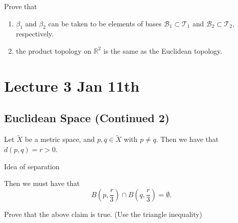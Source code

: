 \documentclass[notoc,notitlepage]{tufte-book}
\begin{document}
\begin{ex}
  Prove that
  \begin{enumerate}
    \item $\beta_1$ and $\beta_2$ can be taken to be elements of
      bases $\mathcal{B}_1 \subset \mathcal{T}_1$ and
      $\mathcal{B}_2 \subset \mathcal{T}_2$, respectively.
    \item the product topology on $\mathbb{R}^2$ is the same
      as the Euclidean topology.
  \end{enumerate}
\end{ex}



\chapter{Lecture 3 Jan 11th}%
\label{chp:lecture_3_jan_11th}

\section{Euclidean Space (Continued 2)}%
\label{sec:euclidean_space_continued_2}


Let $\tilde{X}$ be a metric space, and $p, q \in \tilde{X}$ with $p \neq q$.
Then we have that $d(p, q) = r > 0$.
\begin{marginfigure}
  \centering
  \caption{Idea of separation}\label{fig:idea_of_separation}
\end{marginfigure}
Then we must have that
\begin{equation*}
  B \left( p, \frac{r}{3} \right) \cap B \left( q, \frac{r}{3} \right) = \emptyset.
\end{equation*}

\begin{ex}
  Prove that the above claim is true. (Use the triangle inequality)
\end{ex}
\end{document}
